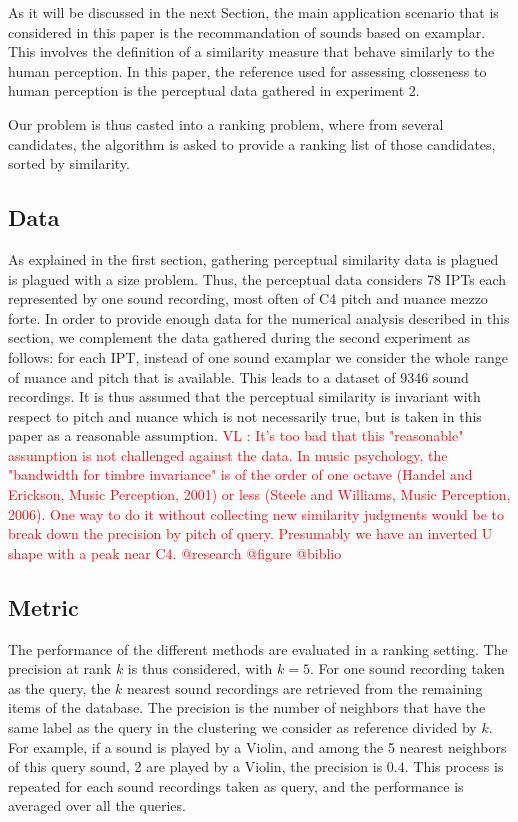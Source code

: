 \documentclass{article}
\newcommand{\ipt}{IPT\xspace}
\newcommand{\ipts}{IPTs\xspace}
\newcommand{\vl}[1]{\textcolor{red}{VL : #1}}
\begin{document}
As it will be discussed in the next Section, the main application scenario that is considered in this paper is the recommandation of sounds based on examplar. This involves the definition of a similarity measure that behave similarly to the human perception. In this paper, the reference used for assessing closseness to human perception is the perceptual data gathered in experiment 2.

Our problem is thus casted into a ranking problem, where from several candidates, the algorithm is asked to provide a ranking list of those candidates, sorted by similarity.

\subsection{Data}

As explained in the first section, gathering perceptual similarity data is plagued is plagued with a size problem. Thus, the perceptual data considers 78 \ipts each represented by one sound recording, most often of C4 pitch and nuance mezzo forte. In order to provide enough data for the numerical analysis described in this section, we complement the data gathered during the second experiment as follows: for each \ipt, instead of one sound examplar we consider the whole range of nuance and pitch that is available. This leads to a dataset of 9346 sound recordings. It is thus assumed that the perceptual similarity is invariant with respect to pitch and nuance which is not necessarily true, but is taken in this paper as a reasonable assumption.
\vl{It's too bad that this "reasonable" assumption is not challenged against the data. In music psychology, the "bandwidth for timbre invariance" is of the order of one octave (Handel and Erickson, Music Perception, 2001) or less (Steele and Williams, Music Perception, 2006).
One way to do it without collecting new similarity judgments would be to break down the precision by pitch of query.
Presumably we have an inverted U shape with a peak near C4.
@research @figure @biblio}

\subsection{Metric}

The performance of the different methods are evaluated in a ranking setting. The precision at rank $k$ is thus considered, with $k=5$. For one sound recording taken as the query, the $k$ nearest sound recordings are retrieved from the remaining items of the database. The precision is the number of neighbors that have the same label as the query in the clustering we consider as reference divided by $k$. For example, if a sound is played by a Violin, and among the 5 nearest neighbors of this query sound, 2 are played by a Violin, the precision is $0.4$. This process is repeated for each sound recordings taken as query, and the performance is averaged over all the queries.
\end{document}
